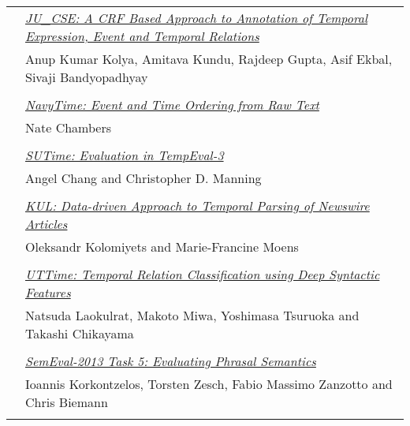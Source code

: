 \begin{tabular}{p{20mm}p{138mm}}
\\
& \hyperlink{page.64}{\em JU\_CSE: A CRF Based Approach to Annotation of Temporal Expression, Event and Temporal Relations}\\
         &  Anup Kumar Kolya, Amitava Kundu, Rajdeep Gupta, Asif Ekbal, Sivaji Bandyopadhyay\\
\\

 & \hyperlink{page.73}{\em NavyTime: Event and Time Ordering from Raw Text}\\
         & Nate Chambers \\
\\

 & \hyperlink{page.78}{\em SUTime: Evaluation in TempEval-3}\\
         & Angel Chang and Christopher D. Manning\\
\\

 & \hyperlink{page.83}{\em KUL: Data-driven Approach to Temporal Parsing of Newswire Articles}\\
         & Oleksandr Kolomiyets and Marie-Francine Moens \\
\\
 & \hyperlink{page.88}{\em UTTime: Temporal Relation Classification using Deep Syntactic Features}\\
         & Natsuda Laokulrat, Makoto Miwa, Yoshimasa Tsuruoka and Takashi Chikayama \\
\\
& \hyperlink{page.39}{\em SemEval-2013 Task 5: Evaluating Phrasal Semantics}\\
         & Ioannis Korkontzelos, Torsten Zesch, Fabio Massimo Zanzotto and Chris Biemann \\
\\

\end{tabular}
\newpage
